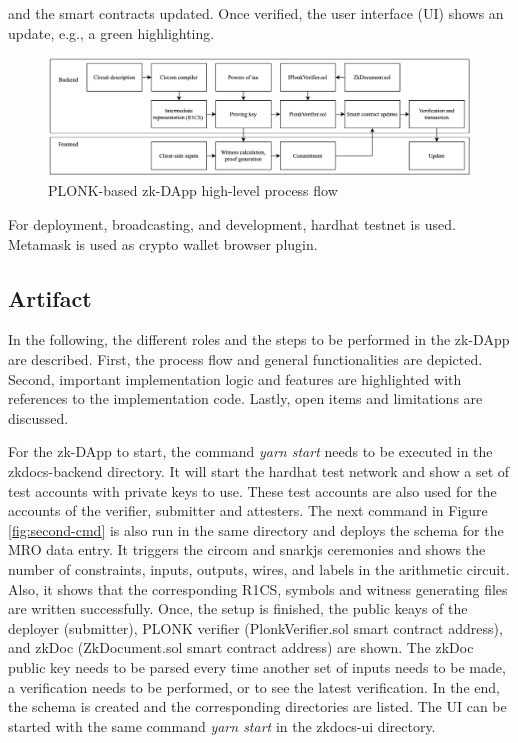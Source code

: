 and the smart contracts updated. Once verified, the user interface (UI) shows an update, e.g., a green highlighting. 
\begin{figure}[hbt]
	\centering
		\includegraphics[width=1.0\textwidth]{Pictures/circom snarkjs process flow.png}
	\caption{PLONK-based zk-DApp high-level process flow}
	\label{fig:zk-DAppgeneral}
\end{figure}
For deployment, broadcasting, and development, hardhat testnet is used. Metamask is used as crypto wallet browser plugin.

\subsection{Artifact}
In the following, the different roles and the steps to be performed in the zk-DApp are described. First, the process flow and general functionalities are depicted. Second, important implementation logic and features are highlighted with references to the implementation code. Lastly, open items and limitations are discussed.

For the zk-DApp to start, the command \textit{yarn start} needs to be executed in the zkdocs-backend directory. It will start the hardhat test network and show a set of test accounts with private keys to use. These test accounts are also used for the accounts of the verifier, submitter and attesters. The next command in Figure \ref{fig:second-cmd} is also run in the same directory and deploys the schema for the MRO data entry. It triggers the circom and snarkjs ceremonies and shows the number of constraints, inputs, outputs, wires, and labels in the arithmetic circuit. Also, it shows that the corresponding R1CS, symbols and witness generating files are written successfully. Once, the setup is finished, the public keays of the deployer (submitter), PLONK verifier (PlonkVerifier.sol smart contract address), and zkDoc (ZkDocument.sol smart contract address) are shown. The zkDoc public key needs to be parsed every time another set of inputs needs to be made, a verification needs to be performed, or to see the latest verification. In the end, the schema is created and the corresponding directories are listed. The UI can be started with the same command \textit{yarn start} in the zkdocs-ui directory.

